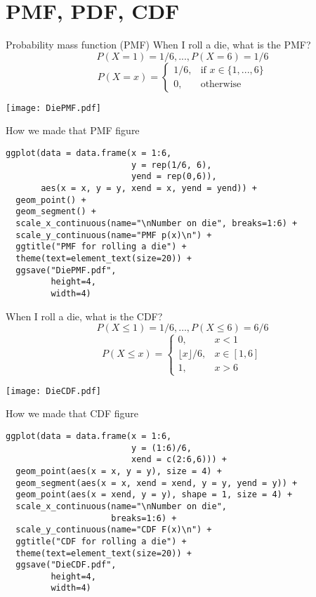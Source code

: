 \documentclass{beamer}
\begin{document}
\section{PMF, PDF, CDF}
\begin{frame}{Probability mass function (PMF)}
When I roll a die, what is the PMF? \pause
$$P(X=1)=1/6,...,P(X=6)=1/6$$
$$P(X=x)=\begin{cases}
  1/6,& \text{if }x\in\{1,...,6\} \\
  0,& \text{otherwise}
\end{cases}$$
\begin{center}\texttt{[image: DiePMF.pdf]}\end{center}
\end{frame}

\begin{frame}[fragile]{How we made that PMF figure}
\begin{verbatim}
ggplot(data = data.frame(x = 1:6,
                         y = rep(1/6, 6),
                         yend = rep(0,6)),
       aes(x = x, y = y, xend = x, yend = yend)) +
  geom_point() +
  geom_segment() +
  scale_x_continuous(name="\nNumber on die", breaks=1:6) +
  scale_y_continuous(name="PMF p(x)\n") +
  ggtitle("PMF for rolling a die") +
  theme(text=element_text(size=20)) +
  ggsave("DiePMF.pdf",
         height=4,
         width=4)
\end{verbatim}
\end{frame}

\begin{frame}{When I roll a die, what is the CDF?}
$$P(X\leq 1)=1/6,\dots,P(X\leq 6)=6/6$$
$$P(X\leq x)=\begin{cases}
  0,& x<1 \\
  \lfloor x\rfloor/6,& x\in [1,6] \\
  1,& x>6
\end{cases}$$
\begin{center}\texttt{[image: DieCDF.pdf]}\end{center}
\end{frame}
\begin{frame}[fragile]{How we made that CDF figure}
\begin{verbatim}
ggplot(data = data.frame(x = 1:6,
                         y = (1:6)/6,
                         xend = c(2:6,6))) +
  geom_point(aes(x = x, y = y), size = 4) +
  geom_segment(aes(x = x, xend = xend, y = y, yend = y)) +
  geom_point(aes(x = xend, y = y), shape = 1, size = 4) +
  scale_x_continuous(name="\nNumber on die",
                     breaks=1:6) +
  scale_y_continuous(name="CDF F(x)\n") +
  ggtitle("CDF for rolling a die") +
  theme(text=element_text(size=20)) +
  ggsave("DieCDF.pdf",
         height=4,
         width=4)
\end{verbatim}
\end{frame}
\end{document}

